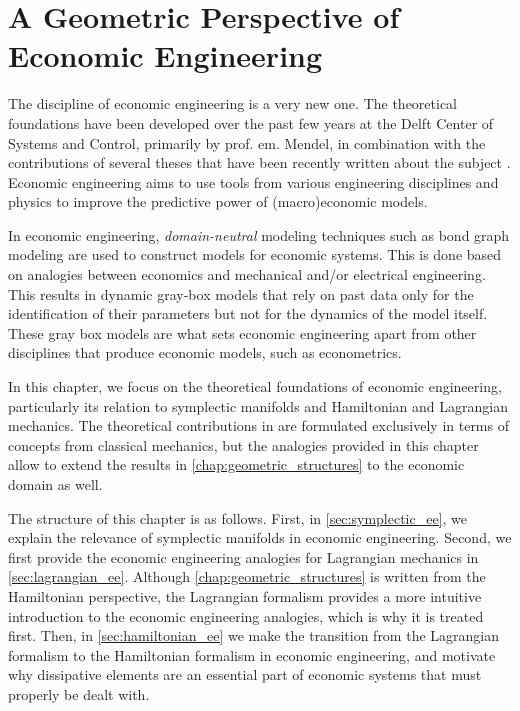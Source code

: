 \chapter{A Geometric Perspective of Economic Engineering}
\label{chap:symplectic_economics}

The discipline of economic engineering is a very new one. The theoretical foundations have been developed over the past few years at the Delft Center of Systems and Control, primarily by prof. em. Mendel,  in combination with the contributions of several theses that have been recently written about the subject \cite{Hutters2020,Kruimer2021,VanArdenne2020,Manders2019}. Economic engineering aims to use tools from various engineering disciplines and physics to improve the predictive power of (macro)economic models.

In economic engineering, \emph{domain-neutral} modeling techniques such as bond graph modeling are used to construct models for economic systems. This is done based on analogies between economics and mechanical and/or electrical engineering. This results in dynamic gray-box models that rely on past data only for the identification of their parameters but not for the dynamics of the model itself. These gray box models are what sets economic engineering apart from other disciplines that produce economic models, such as econometrics.

In this chapter, we focus on the theoretical foundations of economic engineering, particularly its relation to symplectic manifolds and Hamiltonian and Lagrangian mechanics. The theoretical contributions in  are formulated exclusively in terms of concepts from classical mechanics, but the analogies provided in this chapter allow to extend the results in \cref{chap:geometric_structures} to the economic domain as well.

The structure of this chapter is as follows. First, in \cref{sec:symplectic_ee}, we explain the relevance of symplectic manifolds in economic engineering. Second, we first provide the economic engineering analogies for Lagrangian mechanics in \cref{sec:lagrangian_ee}. Although \cref{chap:geometric_structures} is written from the Hamiltonian perspective, the Lagrangian formalism provides a more intuitive introduction to the economic engineering analogies, which is why it is treated first. Then, in \cref{sec:hamiltonian_ee} we make the transition from the Lagrangian formalism to the Hamiltonian formalism in economic engineering, and motivate why dissipative elements are an essential part of economic systems that must properly be dealt with.

